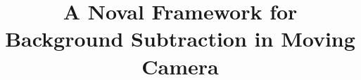 \documentclass[journal]{IEEEtran}
\begin{document}
\title{A Noval Framework for Background Subtraction in Moving Camera}

\maketitle

\end{document}
